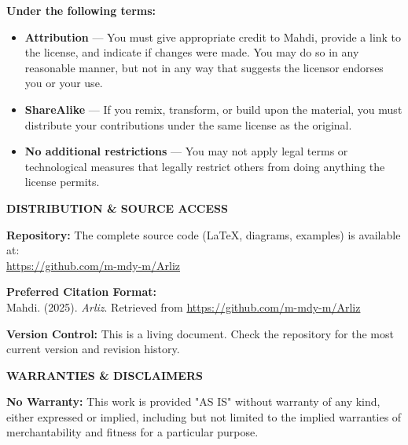 \begin{flushleft}
{		\textbf{Under the following terms:}
		\begin{itemize}\itemsep2pt
			\item \textbf{Attribution} — You must give appropriate credit to Mahdi, provide a link to the license, and indicate if changes were made. You may do so in any reasonable manner, but not in any way that suggests the licensor endorses you or your use.
			\item \textbf{ShareAlike} — If you remix, transform, or build upon the material, you must distribute your contributions under the same license as the original.
			\item \textbf{No additional restrictions} — You may not apply legal terms or technological measures that legally restrict others from doing anything the license permits.
		\end{itemize}
		
		\vspace{1.5em}
		
		\begin{center}
			\textbf{DISTRIBUTION \& SOURCE ACCESS}
		\end{center}
		
		\textbf{Repository:} The complete source code (LaTeX, diagrams, examples) is available at:\\
		\url{https://github.com/m-mdy-m/Arliz}
		
		\textbf{Preferred Citation Format:}\\
		Mahdi. (2025). \textit{Arliz}. Retrieved from \url{https://github.com/m-mdy-m/Arliz}
		
		\textbf{Version Control:} This is a living document. Check the repository for the most current version and revision history.
		
		\vspace{1.5em}
		
		\begin{center}
			\textbf{WARRANTIES \& DISCLAIMERS}
		\end{center}
		
		\textbf{No Warranty:} This work is provided "AS IS" without warranty of any kind, either expressed or implied, including but not limited to the implied warranties of merchantability and fitness for a particular purpose.
		
}
\end{flushleft}
